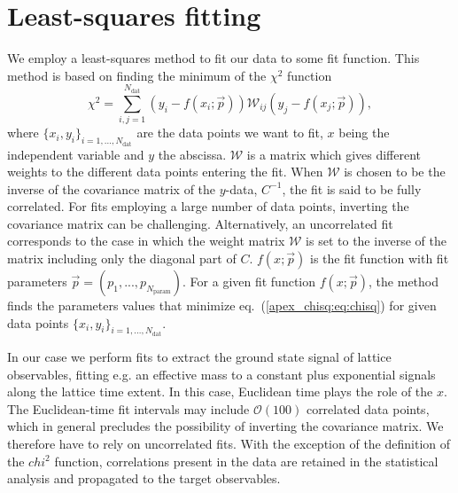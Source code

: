 
\chapter{Least-squares fitting}
\label{apex_chisq}

We employ a least-squares method to fit our data to some fit function. This method is based on finding the  minimum of the $\chi^2$ function
\begin{equation}
\label{apex_chisq:eq:chisq}
\chi^2=\sum_{i,j=1}^{N_{\textrm{dat}}}\left(y_i-f(x_i;\vec{p})\right)\mathcal{W}_{ij}\left(y_j-f(x_j;\vec{p})\right),
\end{equation}
where $\{x_i,y_i\}_{i=1,...,N_{\textrm{dat}}}$ are the data points we want to fit, $x$ being the independent variable and $y$ the abscissa. $\mathcal{W}$ is a matrix which gives different weights to the different data points entering the fit. When $\mathcal{W}$ is chosen to be the inverse of the covariance matrix of the $y$-data, $C^{-1}$, the fit is said to be fully correlated. For fits employing a large number of data points, inverting the covariance matrix can be challenging. Alternatively, an uncorrelated fit corresponds to the case in which the weight matrix $\mathcal{W}$ is set to the  inverse of the matrix including only the diagonal part of $C$. $f(x;\vec{p})$ is the fit function with fit parameters $\vec{p}=(p_1,...,p_{N_{\textrm{param}}})$. For a given fit function $f(x;\vec{p})$, the method finds the parameters values that minimize eq.~(\ref{apex_chisq:eq:chisq}) for given data points $\{x_i,y_i\}_{i=1,...,N_{\textrm{dat}}}$.

In our case we perform fits to extract the ground state signal of lattice observables, fitting e.g. an effective mass to a constant plus exponential signals along the lattice time extent. In this case, Euclidean time plays the role of the $x$. The Euclidean-time fit intervals may include $\mathcal{O}(100)$ correlated data points, which in general precludes the possibility of inverting the covariance matrix. We therefore have to rely on uncorrelated fits. With the exception of the definition of the $chi^2$ function, correlations present in the data are retained in the statistical analysis and propagated to the target observables.

